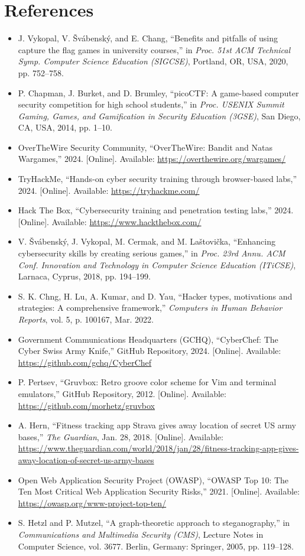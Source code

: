 \documentclass[11pt,a4paper]{article}
\begin{document}
\section*{References}

\begin{itemize}[label={}, leftmargin=0pt, itemsep=0.65em]
    \item J. Vykopal, V. Švábenský, and E. Chang, ``Benefits and pitfalls of using capture the flag games in university courses,'' in \textit{Proc. 51st ACM Technical Symp. Computer Science Education (SIGCSE)}, Portland, OR, USA, 2020, pp. 752--758.
    \item P. Chapman, J. Burket, and D. Brumley, ``picoCTF: A game-based computer security competition for high school students,'' in \textit{Proc. USENIX Summit Gaming, Games, and Gamification in Security Education (3GSE)}, San Diego, CA, USA, 2014, pp. 1--10.
    \item OverTheWire Security Community, ``OverTheWire: Bandit and Natas Wargames,'' 2024. [Online]. Available: \url{https://overthewire.org/wargames/}
    \item TryHackMe, ``Hands-on cyber security training through browser-based labs,'' 2024. [Online]. Available: \url{https://tryhackme.com/}
    \item Hack The Box, ``Cybersecurity training and penetration testing labs,'' 2024. [Online]. Available: \url{https://www.hackthebox.com/}
    \item V. Švábenský, J. Vykopal, M. Cermak, and M. Laštovička, ``Enhancing cybersecurity skills by creating serious games,'' in \textit{Proc. 23rd Annu. ACM Conf. Innovation and Technology in Computer Science Education (ITiCSE)}, Larnaca, Cyprus, 2018, pp. 194--199.
    \item S. K. Chng, H. Lu, A. Kumar, and D. Yau, ``Hacker types, motivations and strategies: A comprehensive framework,'' \textit{Computers in Human Behavior Reports}, vol. 5, p. 100167, Mar. 2022.
    \item Government Communications Headquarters (GCHQ), ``CyberChef: The Cyber Swiss Army Knife,'' GitHub Repository, 2024. [Online]. Available: \url{https://github.com/gchq/CyberChef}
    \item P. Pertsev, ``Gruvbox: Retro groove color scheme for Vim and terminal emulators,'' GitHub Repository, 2012. [Online]. Available: \url{https://github.com/morhetz/gruvbox}
    \item A. Hern, ``Fitness tracking app Strava gives away location of secret US army bases,'' \textit{The Guardian}, Jan. 28, 2018. [Online]. Available: \url{https://www.theguardian.com/world/2018/jan/28/fitness-tracking-app-gives-away-location-of-secret-us-army-bases}
    \item Open Web Application Security Project (OWASP), ``OWASP Top 10: The Ten Most Critical Web Application Security Risks,'' 2021. [Online]. Available: \url{https://owasp.org/www-project-top-ten/}
    \item S. Hetzl and P. Mutzel, ``A graph-theoretic approach to steganography,'' in \textit{Communications and Multimedia Security (CMS)}, Lecture Notes in Computer Science, vol. 3677. Berlin, Germany: Springer, 2005, pp. 119--128.
\end{itemize}
\end{document}
